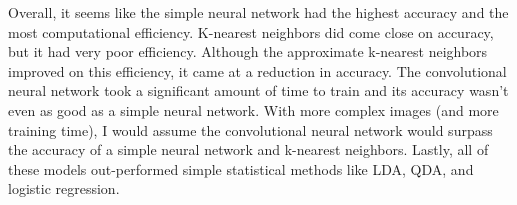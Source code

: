 \documentclass[11pt]{article}
\begin{document}
    Overall, it seems like the simple neural network had the highest
accuracy and the most computational efficiency. K-nearest neighbors did
come close on accuracy, but it had very poor efficiency. Although the
approximate k-nearest neighbors improved on this efficiency, it came at
a reduction in accuracy. The convolutional neural network took a
significant amount of time to train and its accuracy wasn't even as good
as a simple neural network. With more complex images (and more training
time), I would assume the convolutional neural network would surpass the
accuracy of a simple neural network and k-nearest neighbors. Lastly, all
of these models out-performed simple statistical methods like LDA, QDA,
and logistic regression.


    
    
    
    
\end{document}
